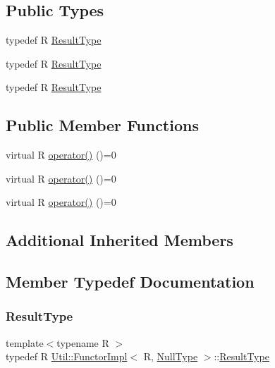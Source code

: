 \subsection*{Public Types}
\begin{DoxyCompactItemize}
\item 
typedef R \mbox{\hyperlink{classUtil_1_1FunctorImpl_3_01R_00_01NullType_01_4_a082742999a1f3173c7907c2322861fe5}{Result\+Type}}
\item 
typedef R \mbox{\hyperlink{classUtil_1_1FunctorImpl_3_01R_00_01NullType_01_4_a082742999a1f3173c7907c2322861fe5}{Result\+Type}}
\item 
typedef R \mbox{\hyperlink{classUtil_1_1FunctorImpl_3_01R_00_01NullType_01_4_a082742999a1f3173c7907c2322861fe5}{Result\+Type}}
\end{DoxyCompactItemize}
\subsection*{Public Member Functions}
\begin{DoxyCompactItemize}
\item 
virtual R \mbox{\hyperlink{classUtil_1_1FunctorImpl_3_01R_00_01NullType_01_4_a91bac1d58b637b1b4bd5e5da7ebb8c82}{operator()}} ()=0
\item 
virtual R \mbox{\hyperlink{classUtil_1_1FunctorImpl_3_01R_00_01NullType_01_4_a91bac1d58b637b1b4bd5e5da7ebb8c82}{operator()}} ()=0
\item 
virtual R \mbox{\hyperlink{classUtil_1_1FunctorImpl_3_01R_00_01NullType_01_4_a91bac1d58b637b1b4bd5e5da7ebb8c82}{operator()}} ()=0
\end{DoxyCompactItemize}
\subsection*{Additional Inherited Members}


\subsection{Member Typedef Documentation}
\mbox{\label{classUtil_1_1FunctorImpl_3_01R_00_01NullType_01_4_a082742999a1f3173c7907c2322861fe5}} 
\subsubsection{\texorpdfstring{ResultType}{ResultType}\hspace{0.1cm}{\footnotesize\ttfamily [1/3]}}
{\footnotesize\ttfamily template$<$typename R $>$ \\
typedef R \mbox{\hyperlink{classUtil_1_1FunctorImpl}{Util\+::\+Functor\+Impl}}$<$ R, \mbox{\hyperlink{classUtil_1_1NullType}{Null\+Type}} $>$\+::\mbox{\hyperlink{structUtil_1_1Private_1_1FunctorImplBase_a5e95fd30fdd89f3c5080b68ab5891bc3}{Result\+Type}}}


